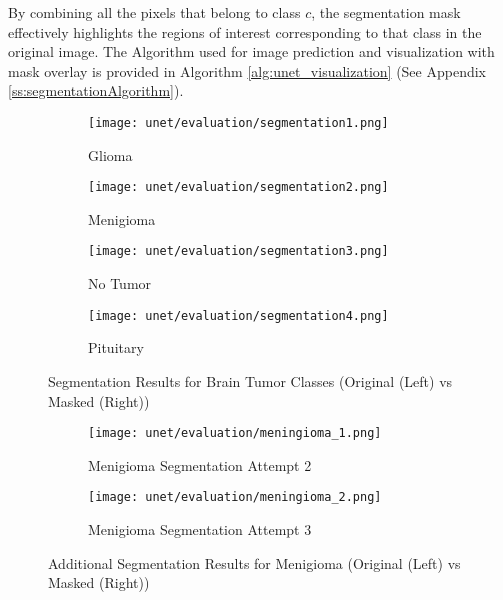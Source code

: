 By combining all the pixels that belong to class $c$, the segmentation mask effectively highlights the regions of interest corresponding to that class in the original image. The Algorithm used for image prediction and visualization with mask overlay is provided in Algorithm \ref{alg:unet_visualization} (See Appendix \ref{ss:segmentationAlgorithm}).

\begin{figure}[H]
  \centering
  \begin{subfigure}[b]{0.23\textwidth}
    \centering
    \texttt{[image: unet/evaluation/segmentation1.png]}
    \caption{Glioma}
    \label{fig:glio_seg}
  \end{subfigure}
  \hfill
  \begin{subfigure}[b]{0.23\textwidth}
    \centering
    \texttt{[image: unet/evaluation/segmentation2.png]}
    \caption{Menigioma}
    \label{fig:meng_seg}
  \end{subfigure}
  \hfill
  \begin{subfigure}[b]{0.23\textwidth}
    \centering
    \texttt{[image: unet/evaluation/segmentation3.png]}
    \caption{No Tumor}
    \label{fig:no_tumor_seg}
  \end{subfigure}
  \hfill
  \begin{subfigure}[b]{0.23\textwidth}
    \centering
    \texttt{[image: unet/evaluation/segmentation4.png]}
    \caption{Pituitary}
    \label{fig:pitu_seg}
  \end{subfigure}
  \caption{Segmentation Results for Brain Tumor Classes (Original (Left) vs Masked (Right))}
  \label{fig:segmentation_results}
\end{figure}

\begin{figure}[H]
  \centering
  \begin{subfigure}[b]{0.23\textwidth}
    \centering
    \texttt{[image: unet/evaluation/meningioma\_1.png]}
    \caption{Menigioma Segmentation Attempt 2}
    \label{fig:meningioma_1}
  \end{subfigure}
  \begin{subfigure}[b]{0.23\textwidth}
    \centering
    \texttt{[image: unet/evaluation/meningioma\_2.png]}
    \caption{Menigioma Segmentation Attempt 3}
    \label{fig:mengioma_2}
  \end{subfigure}
  \caption{Additional Segmentation Results for Menigioma (Original (Left) vs Masked (Right))}
  \label{fig:meningioma_segmentation}
\end{figure}


